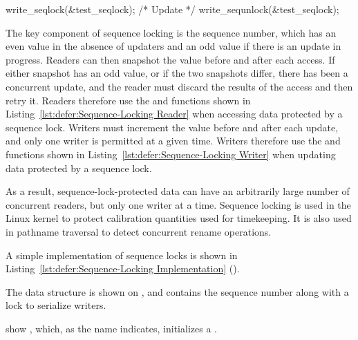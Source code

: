 \begin{listing}[bp]
\begin{VerbatimL}
write_seqlock(&test_seqlock);
/* Update */
write_sequnlock(&test_seqlock);
\end{VerbatimL}
\caption{Sequence-Locking Writer}
\label{lst:defer:Sequence-Locking Writer}
\end{listing}

The key component of sequence locking is the sequence number, which has
an even value in the absence of updaters and an odd value if there
is an update in progress.
Readers can then snapshot the value before and after each access.
If either snapshot has an odd value, or if the two snapshots differ,
there has been a concurrent update, and the reader must discard
the results of the access and then retry it.
Readers therefore use the  and 
functions shown in Listing~\ref{lst:defer:Sequence-Locking Reader}
when accessing data protected by a sequence lock.
Writers must increment the value before and after each update,
and only one writer is permitted at a given time.
Writers therefore use the  and 
functions shown in Listing~\ref{lst:defer:Sequence-Locking Writer}
when updating data protected by a sequence lock.

As a result, sequence-lock-protected data can have an arbitrarily
large number of concurrent readers, but only one writer at a time.
Sequence locking is used in the Linux kernel to protect calibration
quantities used for timekeeping.
It is also used in pathname traversal to detect concurrent rename operations.

\begin{listing}[tb]

\caption{Sequence-Locking Implementation}
\label{lst:defer:Sequence-Locking Implementation}
\end{listing}

A simple implementation of sequence locks is shown in
Listing~\ref{lst:defer:Sequence-Locking Implementation}
().
\begin{fcvref}
The  data structure is shown on
, and contains
the sequence number along with a lock to serialize writers.
\end{fcvref}
\begin{fcvref}
 show , which, as the name indicates,
initializes a .
\end{fcvref}

